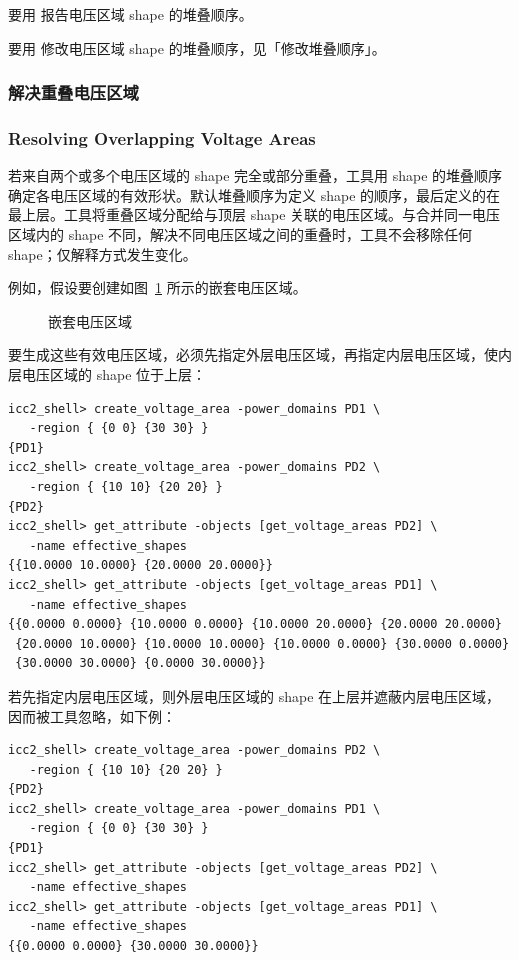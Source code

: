 要用  报告电压区域 shape 的堆叠顺序。

要用  修改电压区域 shape 的堆叠顺序，见「修改堆叠顺序」。

\subsubsection{解决重叠电压区域}
\subsubsection*{Resolving Overlapping Voltage Areas}

若来自两个或多个电压区域的 shape 完全或部分重叠，工具用 shape 的堆叠顺序确定各电压区域的有效形状。默认堆叠顺序为定义 shape 的顺序，最后定义的在最上层。工具将重叠区域分配给与顶层 shape 关联的电压区域。与合并同一电压区域内的 shape 不同，解决不同电压区域之间的重叠时，工具不会移除任何 shape；仅解释方式发生变化。

例如，假设要创建如图~\ref{fig:nested-va} 所示的嵌套电压区域。

\begin{figure}[htbp]
\centering
{}
\caption{嵌套电压区域}
\label{fig:nested-va}
\end{figure}

要生成这些有效电压区域，必须先指定外层电压区域，再指定内层电压区域，使内层电压区域的 shape 位于上层：
\begin{lstlisting}
icc2_shell> create_voltage_area -power_domains PD1 \
   -region { {0 0} {30 30} }
{PD1}
icc2_shell> create_voltage_area -power_domains PD2 \
   -region { {10 10} {20 20} }
{PD2}
icc2_shell> get_attribute -objects [get_voltage_areas PD2] \
   -name effective_shapes
{{10.0000 10.0000} {20.0000 20.0000}}
icc2_shell> get_attribute -objects [get_voltage_areas PD1] \
   -name effective_shapes
{{0.0000 0.0000} {10.0000 0.0000} {10.0000 20.0000} {20.0000 20.0000}
 {20.0000 10.0000} {10.0000 10.0000} {10.0000 0.0000} {30.0000 0.0000}
 {30.0000 30.0000} {0.0000 30.0000}}
\end{lstlisting}

若先指定内层电压区域，则外层电压区域的 shape 在上层并遮蔽内层电压区域，因而被工具忽略，如下例：
\begin{lstlisting}
icc2_shell> create_voltage_area -power_domains PD2 \
   -region { {10 10} {20 20} }
{PD2}
icc2_shell> create_voltage_area -power_domains PD1 \
   -region { {0 0} {30 30} }
{PD1}
icc2_shell> get_attribute -objects [get_voltage_areas PD2] \
   -name effective_shapes
icc2_shell> get_attribute -objects [get_voltage_areas PD1] \
   -name effective_shapes
{{0.0000 0.0000} {30.0000 30.0000}}
\end{lstlisting}

